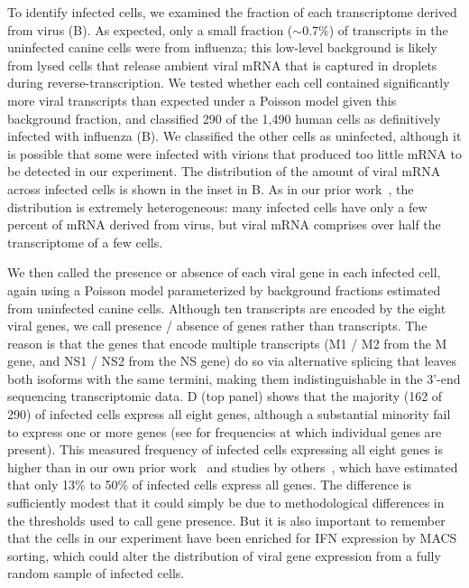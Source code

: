 \documentclass[9pt,lineno]{elife}
\begin{document}
To identify infected cells, we examined the fraction of each transcriptome derived from virus (B).
As expected, only a small fraction ($\sim$0.7\%) of transcripts in the uninfected canine cells were from influenza; this low-level background is likely from lysed cells that release ambient viral mRNA that is captured in droplets during reverse-transcription.
We tested whether each cell contained significantly more viral transcripts than expected under a Poisson model given this background fraction, and classified 290 of the 1,490 human cells as definitively infected with influenza (B).
We classified the other cells as uninfected, although it is possible that some were infected with virions that produced too little mRNA to be detected in our experiment.
The distribution of the amount of viral mRNA across infected cells is shown in the inset in B.
As in our prior work~\citep{russell2018extreme}, the distribution is extremely heterogeneous: many infected cells have only a few percent of mRNA derived from virus, but viral mRNA comprises over half the transcriptome of a few cells.

We then called the presence or absence of each viral gene in each infected cell, again using a Poisson model parameterized by background fractions estimated from uninfected canine cells.
Although ten transcripts are encoded by the eight viral genes, we call presence / absence of genes rather than transcripts.
The reason is that the genes that encode multiple transcripts (M1 / M2 from the M gene, and NS1 / NS2 from the NS gene) do so via alternative splicing that leaves both isoforms with the same termini, making them indistinguishable in the 3'-end sequencing transcriptomic data.
D (top panel) shows that the majority (162 of 290) of infected cells express all eight genes, although a substantial minority fail to express one or more genes (see  for frequencies at which individual genes are present).
This measured frequency of infected cells expressing all eight genes is higher than in our own prior work~\citep{russell2018extreme} and studies by others~\citep{brooke2013most, heldt2015single, dou2017analysis}, which have estimated that only 13\% to 50\% of infected cells express all genes. 
The difference is sufficiently modest that it could simply be due to methodological differences in the thresholds used to call gene presence.
But it is also important to remember that the cells in our experiment have been enriched for IFN expression by MACS sorting, which could alter the distribution of viral gene expression from a fully random sample of infected cells.
\end{document}
